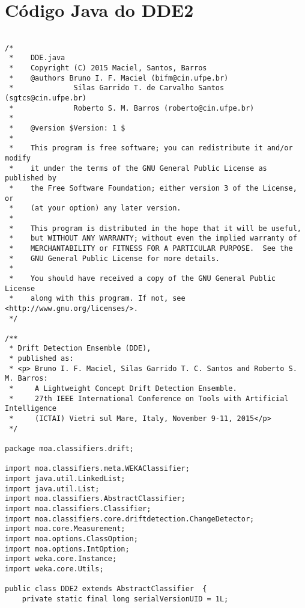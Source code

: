 \chapter{Código Java do DDE2}
\label{chap:dde2java}






\begin{lstlisting}[caption={Código em linguagem de programação Java do DDE2},label=dde2java]

/*
 *    DDE.java
 *    Copyright (C) 2015 Maciel, Santos, Barros 
 *    @authors Bruno I. F. Maciel (bifm@cin.ufpe.br)
 *    			Silas Garrido T. de Carvalho Santos (sgtcs@cin.ufpe.br)
 *             	Roberto S. M. Barros (roberto@cin.ufpe.br) 
 *             
 *    @version $Version: 1 $
 *
 *    This program is free software; you can redistribute it and/or modify
 *    it under the terms of the GNU General Public License as published by
 *    the Free Software Foundation; either version 3 of the License, or
 *    (at your option) any later version.
 *
 *    This program is distributed in the hope that it will be useful,
 *    but WITHOUT ANY WARRANTY; without even the implied warranty of
 *    MERCHANTABILITY or FITNESS FOR A PARTICULAR PURPOSE.  See the
 *    GNU General Public License for more details.
 *
 *    You should have received a copy of the GNU General Public License
 *    along with this program. If not, see <http://www.gnu.org/licenses/>.
 */

/**
 * Drift Detection Ensemble (DDE),
 * published as:
 * <p> Bruno I. F. Maciel, Silas Garrido T. C. Santos and Roberto S. M. Barros: 
 *     A Lightweight Concept Drift Detection Ensemble. 
 *     27th IEEE International Conference on Tools with Artificial Intelligence 
 *     (ICTAI) Vietri sul Mare, Italy, November 9-11, 2015</p>
 */

package moa.classifiers.drift;

import moa.classifiers.meta.WEKAClassifier;
import java.util.LinkedList;
import java.util.List;
import moa.classifiers.AbstractClassifier;
import moa.classifiers.Classifier;
import moa.classifiers.core.driftdetection.ChangeDetector;
import moa.core.Measurement;
import moa.options.ClassOption;
import moa.options.IntOption;
import weka.core.Instance;
import weka.core.Utils;

public class DDE2 extends AbstractClassifier  {
    private static final long serialVersionUID = 1L;
	

\end{lstlisting}
